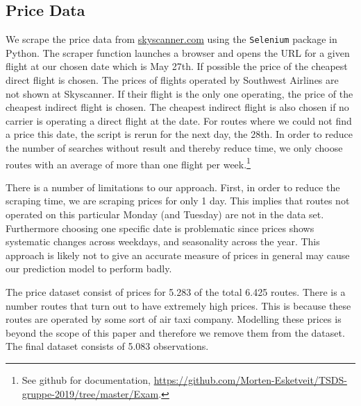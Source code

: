 \subsection{Price Data}
We scrape the price data from \url{skyscanner.com} using the \texttt{Selenium} package in Python. The scraper function launches a browser and opens the URL for a given flight at our chosen date which is May 27th. If possible the price of the cheapest direct flight is chosen. The prices of flights operated by Southwest Airlines are not shown at Skyscanner. If their flight is the only one operating, the price of the cheapest indirect flight is chosen. The cheapest indirect flight is also chosen if no carrier is operating a direct flight at the date. For routes where we could not find a price this date, the script is rerun for the next day, the 28th. In order to reduce the number of searches without result and thereby reduce time, we only choose routes with an average of more than one flight per week.\footnote{See github for documentation, \url{https://github.com/Morten-Esketveit/TSDS-gruppe-2019/tree/master/Exam}.}

There is a number of limitations to our approach. First, in order to reduce the scraping time, we are scraping prices for only 1 day. This implies that routes not operated on this particular Monday (and Tuesday) are not in the data set. Furthermore choosing one specific date is problematic since prices shows systematic changes across weekdays, and seasonality across the year. This approach is likely not to give an accurate measure of prices in general may cause our prediction model to perform badly. 

The price dataset consist of prices for 5.283 of the total 6.425 routes. There is a number routes that turn out to have extremely high prices. This is because these routes are operated by some sort of air taxi company. Modelling these prices is beyond the scope of this paper and therefore we remove them from the dataset. The final dataset consists of 5.083 observations.





